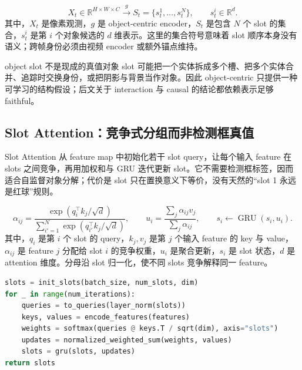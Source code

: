 
\[
X_t\in\mathbb{R}^{H\times W\times C}
\xrightarrow{g}
S_t=\{s_t^1,\ldots,s_t^N\},
\qquad s_t^i\in\mathbb{R}^{d}.
\]
其中，$X_t$ 是像素观测，$g$ 是 object-centric encoder，$S_t$ 是包含 $N$ 个 slot 的集合，$s_t^i$ 是第 $i$ 个对象候选的 $d$ 维表示。这里的集合符号意味着 slot 顺序本身没有语义；跨帧身份必须由视频 encoder 或额外锚点维持。

\begin{warningbox}{object slot 不是现成的真值对象}
slot 可能把一个实体拆成多个槽、把多个实体合并、追踪时交换身份，或把阴影与背景当作对象。因此 object-centric 只提供一种可学习的结构假设；后文关于 interaction 与 causal 的结论都依赖表示足够 faithful。
\end{warningbox}

\subsection{Slot Attention：竞争式分组而非检测框真值}

Slot Attention 从 feature map 中初始化若干 slot query，让每个输入 feature 在 slots 之间竞争，再用加权和与 GRU 迭代更新 slot。它不需要检测框标签，因而适合自监督对象分解；代价是 slot 只在置换意义下等价，没有天然的``slot 1 永远是红球''规则。



\[
\alpha_{ij}=\frac{\exp(q_i^\top k_j/\sqrt d)}{\sum_{i'=1}^{N}\exp(q_{i'}^\top k_j/\sqrt d)},
\qquad
u_i=\frac{\sum_j \alpha_{ij}v_j}{\sum_j\alpha_{ij}},
\qquad
s_i\leftarrow\operatorname{GRU}(s_i,u_i).
\]
其中，$q_i$ 是第 $i$ 个 slot 的 query，$k_j,v_j$ 是第 $j$ 个输入 feature 的 key 与 value，$\alpha_{ij}$ 是 feature $j$ 分配给 slot $i$ 的竞争权重，$u_i$ 是聚合更新，$s_i$ 是 slot 状态，$d$ 是 attention 维度。分母沿 slot 归一化，使不同 slots 竞争解释同一 feature。

\begin{lstlisting}[language=Python,caption={Slot Attention 的最小机制伪代码}]
slots = init_slots(batch_size, num_slots, dim)
for _ in range(num_iterations):
    queries = to_queries(layer_norm(slots))
    keys, values = encode_features(features)
    weights = softmax(queries @ keys.T / sqrt(dim), axis="slots")
    updates = normalized_weighted_sum(weights, values)
    slots = gru(slots, updates)
return slots
\end{lstlisting}


